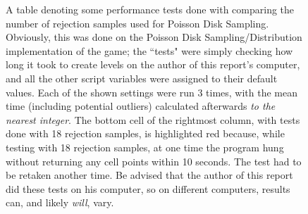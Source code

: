 \begin{figure}[H]
    \centering
    \begin{center}
    \end{center}
    \caption{A table denoting some performance tests done with comparing the number of rejection samples used for Poisson Disk Sampling. Obviously, this was done on the Poisson Disk Sampling/Distribution implementation of the game; the ``tests" were simply checking how long it took to create levels on the author of this report's computer, and all the other script variables were assigned to their default values. Each of the shown settings were run 3 times, with the mean time (including potential outliers) calculated afterwards \textit{to the nearest integer}. The bottom cell of the rightmost column, with tests done with 18 rejection samples, is highlighted red because, while testing with 18 rejection samples, at one time the program hung without returning any cell points within 10 seconds. The test had to be retaken another time. Be advised that the author of this report did these tests on his computer, so on different computers, results can, and likely \textit{will}, vary.}
    \label{fig:table4}
\end{figure}

